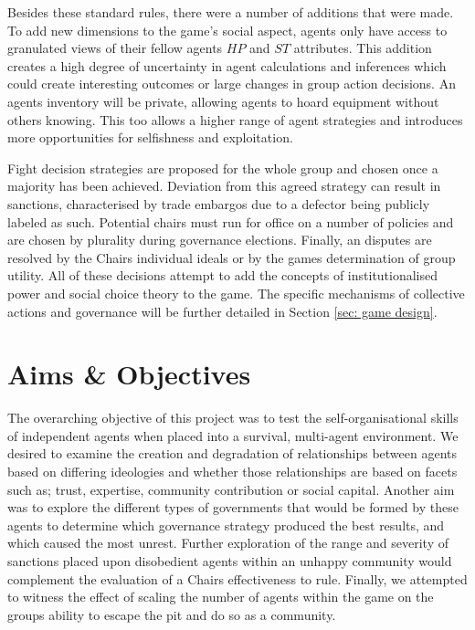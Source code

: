 Besides these standard rules, there were a number of additions that were made. To add new dimensions to the game's social aspect, agents only have access to granulated views of their fellow agents $HP$ and $ST$ attributes. This addition creates a high degree of uncertainty in agent calculations and inferences which could create interesting outcomes or large changes in group action decisions. An agents inventory will be private, allowing agents to hoard equipment without others knowing. This too allows a higher range of agent strategies and introduces more opportunities for selfishness and exploitation. 

Fight decision strategies are proposed for the whole group and chosen once a majority has been achieved. Deviation from this agreed strategy can result in sanctions, characterised by trade embargos due to a defector being publicly labeled as such. Potential chairs must run for office on a number of policies and are chosen by plurality during governance elections. Finally, an disputes are resolved by the Chairs individual ideals or by the games determination of group utility. All of these decisions attempt to add the concepts of institutionalised power and social choice theory to the game. The specific mechanisms of collective actions and governance will be further detailed in Section \ref{sec: game design}. 


\section{Aims \& Objectives}\label{sec:aims}

The overarching objective of this project was to test the self-organisational skills of independent agents when placed into a survival, multi-agent environment. We desired to examine the creation and degradation of relationships between agents based on differing ideologies and whether those relationships are based on facets such as; trust, expertise, community contribution or social capital. Another aim was to explore the different types of governments that would be formed by these agents to determine which governance strategy produced the best results, and which caused the most unrest. Further exploration of the range and severity of sanctions placed upon disobedient agents within an unhappy community would complement the evaluation of a Chairs effectiveness to rule. Finally, we attempted to witness the effect of scaling the number of agents within the game on the groups ability to escape the pit and do so as a community. 

